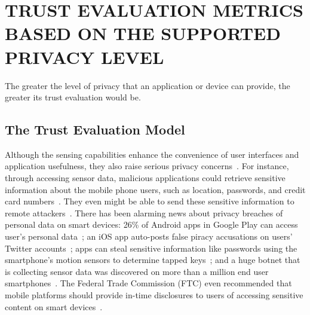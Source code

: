 \section{TRUST EVALUATION METRICS BASED ON THE SUPPORTED PRIVACY LEVEL}
\label{sec:blursense}
The greater the level of privacy that an application or device can provide, the greater its trust evaluation would be.

\subsection{The Trust Evaluation Model}
Although the sensing capabilities enhance the convenience of user interfaces and
application usefulness, they also raise serious privacy
concerns~\cite{shabtai2010google}. For instance, through accessing sensor data,
malicious applications could retrieve sensitive information about the mobile
phone users, such as location, passwords, and credit card numbers~\cite{xu2012taplogger, 
miluzzo2012tapprints, xu2009stealthy, cai2011touchlogger}. They
even might be able to send these sensitive information to remote
attackers~\cite{schlegel2011soundcomber, marquardt2011sp}. There
has been alarming news about privacy breaches of personal data on smart devices:
26\% of Android apps in Google Play can access user's personal
data~\cite{toomuch}; an iOS app auto-posts false piracy accusations on users'
Twitter accounts~\cite{tweetios}; apps can steal sensitive information like
passwords using the smartphone's motion sensors to determine tapped
keys~\cite{xu2012taplogger}; and a huge botnet that is collecting sensor data
was discovered on more than a million end user smartphones~\cite{botnet}. The
Federal Trade Commission (FTC) even recommended that mobile platforms should
provide in-time disclosures to users of accessing sensitive content on smart
devices~\cite{ftc}. 

